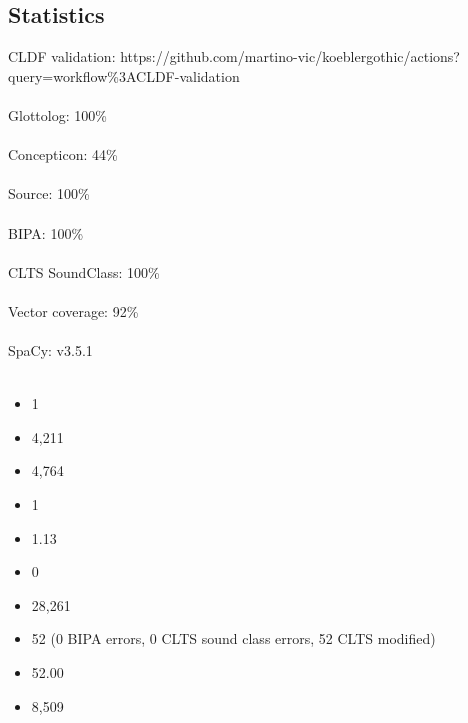 \documentclass[letterpaper,10pt,english]{sphinxmanual}
\begin{document}
\subsection{Statistics}
\label{\detokenize{home:statistics}}
\sphinxAtStartPar
CLDF validation: https://github.com/martino-vic/koeblergothic/actions?query=workflow\%3ACLDF-validation\\\\
 Glottolog: 100\%\\\\
 Concepticon: 44\%\\\\
 Source: 100\%\\\\
BIPA: 100\%\\\\
 CLTS SoundClass: 100\%\\\\
 Vector coverage: 92\%\\\\
 SpaCy: v3.5.1\\\\

\begin{itemize}
\item {} 
\sphinxAtStartPar
{} 1

\item {} 
\sphinxAtStartPar
{} 4,211

\item {} 
\sphinxAtStartPar
{} 4,764

\item {} 
\sphinxAtStartPar
{} 1

\item {} 
\sphinxAtStartPar
{} 1.13

\item {} 
\sphinxAtStartPar
{} 0

\item {} 
\sphinxAtStartPar
{} 28,261

\item {} 
\sphinxAtStartPar
{} 52 (0 BIPA errors, 0 CLTS sound class errors, 52 CLTS
modified)

\item {} 
\sphinxAtStartPar
{} 52.00

\item {} 
\sphinxAtStartPar
{} 8,509

\end{itemize}
\end{document}
